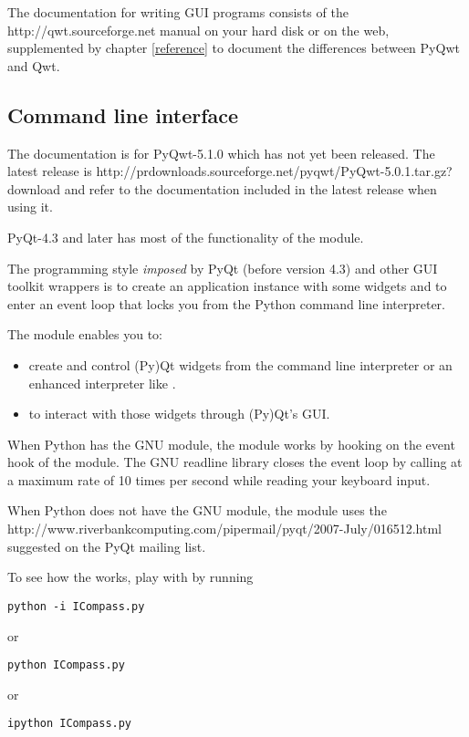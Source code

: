 \documentclass{manual}
\newcommand{\Qwt}{\ulink{Qwt}
  {http://qwt.sourceforge.net}}
\newcommand{\PyQwtLatestTarGz}{\ulink{PyQwt-5.0.1.tar.gz}
  {http://prdownloads.sourceforge.net/pyqwt/PyQwt-5.0.1.tar.gz?download}}
\newcommand{\Future}{
  \begin{notice}[warning]
    The documentation is for PyQwt-5.1.0 which has not yet been released. The
    latest release is \PyQwtLatestTarGz{} and refer to the documentation
    included in the latest release when using it.
  \end{notice}
}
\begin{document}
The documentation for writing GUI programs consists of the \Qwt{} manual on
your hard disk or on the web, supplemented by chapter \ref{reference} to
document the differences between PyQwt and Qwt.


\subsection{Command line interface
  \label{cli-intro}}

\Future{}

\begin{notice}[note]
  PyQt-4.3 and later has most of the functionality of the 
  module.
\end{notice}

The programming style \emph{imposed} by PyQt (before version 4.3) and other
GUI toolkit wrappers is to create an application instance with some widgets
and to enter an event loop that locks you from the Python command line
interpreter.

The  module enables you to:
\begin{itemize}
\item
  create and control (Py)Qt widgets from the command line interpreter or an
  enhanced interpreter like .
\item
  to interact with those widgets through (Py)Qt's GUI.
\end{itemize}

When Python has the GNU  module, the  module
works by hooking  on the event hook of the
 module. The GNU readline library closes the event loop by
calling   at a maximum rate of 10 times per
second while reading your keyboard input.

When Python does not have the GNU  module, the 
module uses the
{
  {http://www.riverbankcomputing.com/pipermail/pyqt/2007-July/016512.html}}
suggested on the PyQt mailing list.

To see how the  works, play with  by running
\begin{verbatim}
python -i ICompass.py
\end{verbatim}
or
\begin{verbatim}
python ICompass.py
\end{verbatim}
or
\begin{verbatim}
ipython ICompass.py
\end{verbatim}
\end{document}
